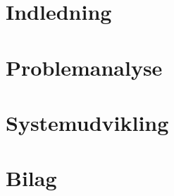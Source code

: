 



\chapter{Indledning}\label{Indledning}



\chapter{Problemanalyse}


 


\chapter{Systemudvikling} 






\begingroup
\raggedright




\endgroup

\appendix
\chapter{Bilag}

%


